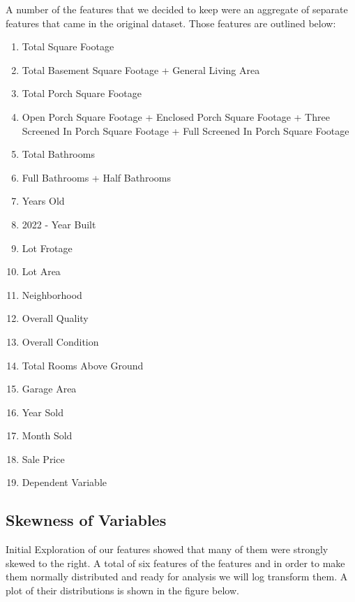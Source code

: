 \documentclass{article}
\begin{document}
	A number of the features that we decided to keep were an aggregate of separate features that came in the original dataset. Those features are outlined below:

	\begin{enumerate}
		\item Total Square Footage
		\item[\textbullet] Total Basement Square Footage + General Living Area
		\item Total Porch Square Footage
		\item[\textbullet] Open Porch Square Footage + Enclosed Porch Square Footage + Three Screened In Porch Square Footage + Full Screened In Porch Square Footage
		\item Total Bathrooms
		\item[\textbullet] Full Bathrooms + Half Bathrooms
		\item Years Old
		\item[\textbullet] 2022 - Year Built
		\item Lot Frotage
		\item Lot Area
		\item Neighborhood
		\item Overall Quality
		\item Overall Condition
		\item Total Rooms Above Ground
		\item Garage Area
		\item Year Sold
		\item Month Sold
		\item Sale Price
		\item Dependent Variable
	\end{enumerate}

	\subsection{Skewness of Variables}
	 
	Initial Exploration of our features showed that many of them were strongly skewed to the right. A total of six features of the features and in order to make them normally distributed and ready for analysis we will log transform them. A plot of their distributions is shown in the figure below.
	
\end{document}
